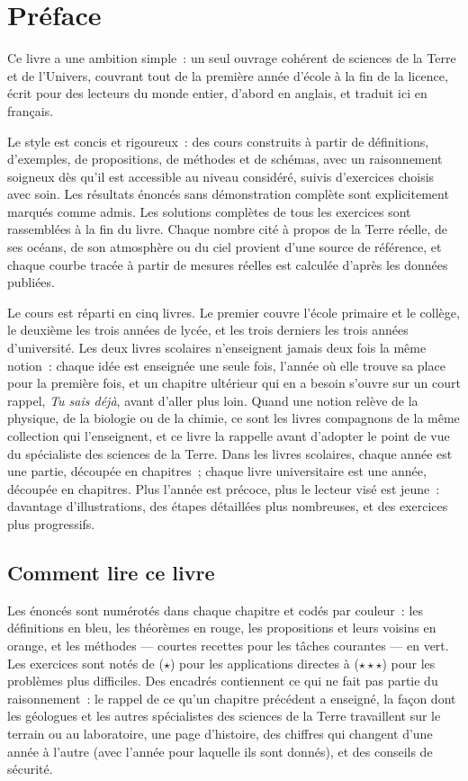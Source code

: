 \chapter{Préface}

Ce livre a une ambition simple~: un seul ouvrage cohérent de sciences de
la Terre et de l'Univers, couvrant tout de la première année d'école à la
fin de la licence, écrit pour des lecteurs du monde entier, d'abord en
anglais, et traduit ici en français.

Le style est concis et rigoureux~: des cours construits à partir de
définitions, d'exemples, de propositions, de méthodes et de schémas, avec
un raisonnement soigneux dès qu'il est accessible au niveau considéré,
suivis d'exercices choisis avec soin. Les résultats énoncés sans
démonstration complète sont explicitement marqués comme admis. Les
solutions complètes de tous les exercices sont rassemblées à la fin du
livre. Chaque nombre cité à propos de la Terre réelle, de ses océans, de
son atmosphère ou du ciel provient d'une source de référence, et chaque
courbe tracée à partir de mesures réelles est calculée d'après les données
publiées.

Le cours est réparti en cinq livres. Le premier couvre l'école primaire et
le collège, le deuxième les trois années de lycée, et les trois derniers
les trois années d'université. Les deux livres scolaires n'enseignent
jamais deux fois la même notion~: chaque idée est enseignée une seule
fois, l'année où elle trouve sa place pour la première fois, et un
chapitre ultérieur qui en a besoin s'ouvre sur un court rappel,
\emph{Tu sais déjà}, avant d'aller plus loin. Quand une notion relève de
la physique, de la biologie ou de la chimie, ce sont les livres
compagnons de la même collection qui l'enseignent, et ce livre la
rappelle avant d'adopter le point de vue du spécialiste des sciences de la
Terre. Dans les livres scolaires, chaque année est une partie, découpée en
chapitres~; chaque livre universitaire est une année, découpée en
chapitres. Plus l'année est précoce, plus le lecteur visé est jeune~:
davantage d'illustrations, des étapes détaillées plus nombreuses, et des
exercices plus progressifs.

\section*{Comment lire ce livre}

Les énoncés sont numérotés dans chaque chapitre et codés par couleur~:
les définitions en bleu, les théorèmes en rouge, les propositions et
leurs voisins en orange, et les méthodes --- courtes recettes pour les
tâches courantes --- en vert. Les exercices sont notés de ($\star$) pour
les applications directes à ($\star\star\star$) pour les problèmes plus
difficiles. Des encadrés contiennent ce qui ne fait pas partie du
raisonnement~: le rappel de ce qu'un chapitre précédent a enseigné, la
façon dont les géologues et les autres spécialistes des sciences de la
Terre travaillent sur le terrain ou au laboratoire, une page d'histoire,
des chiffres qui changent d'une année à l'autre (avec l'année pour
laquelle ils sont donnés), et des conseils de sécurité.

